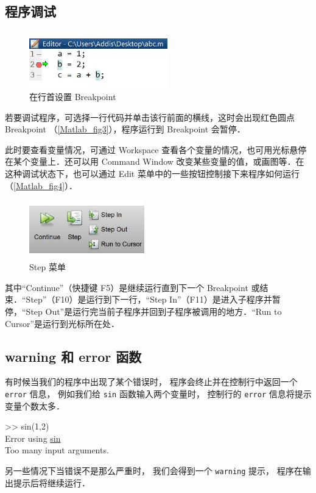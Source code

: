 

\subsection{程序调试}
\begin{figure}[ht]
\centering
\includegraphics[width= 6cm]{./figures/Matlab3.pdf}
\caption{在行首设置 Breakpoint}\label{Matlab_fig3}
\end{figure}

若要调试程序，可选择一行代码并单击该行前面的横线，这时会出现红色圆点 Breakpoint （\autoref{Matlab_fig3}），程序运行到 Breakpoint 会暂停．

此时要查看变量情况，可通过 Workspace 查看各个变量的情况，也可用光标悬停在某个变量上．还可以用 Command Window 改变某些变量的值，或画图等．在这种调试状态下，也可以通过 Edit 菜单中的一些按钮控制接下来程序如何运行（\autoref{Matlab_fig4}）．
\begin{figure}[ht]
\centering
\includegraphics[width= 5cm]{./figures/Matlab4.pdf}
\caption{Step 菜单}\label{Matlab_fig4}
\end{figure}
其中“Continue”（快捷键 F5）是继续运行直到下一个 Breakpoint 或结束．“Step”（F10）是运行到下一行，“Step In”（F11）是进入子程序并暂停，“Step Out”是运行完当前子程序并回到子程序被调用的地方．“Run to Cursor”是运行到光标所在处．

\subsection{warning 和 error 函数}
有时候当我们的程序中出现了某个错误时， 程序会终止并在控制行中返回一个 \texttt{error} 信息， 例如我们给 \texttt{sin} 函数输入两个变量时， 控制行的 \texttt{error} 信息将提示变量个数太多．
\begin{Command}
>> sin(1,2)\\
{\color{error}Error using \underline{sin}\\
Too many input arguments.}
\end{Command}
另一些情况下当错误不是那么严重时， 我们会得到一个 \texttt{warning} 提示， 程序在输出提示后将继续运行．

